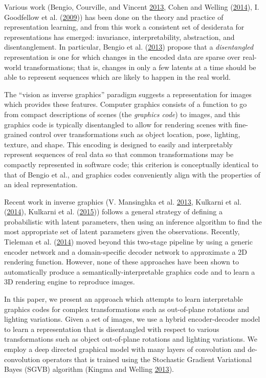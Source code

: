 \documentclass[12pt,twoside]{mitthesis}
\begin{document}
Various work (Bengio, Courville, and Vincent
\protect\hyperlink{ref-bengio2013representation}{2013}, Cohen and
Welling (\protect\hyperlink{ref-cohen2014learning}{2014}), I. Goodfellow
et al. (\protect\hyperlink{ref-goodfellow2009measuring}{2009})) has been
done on the theory and practice of representation learning, and from
this work a consistent set of desiderata for representations has
emerged: invariance, interpretability, abstraction, and disentanglement.
In particular, Bengio et al.
(\protect\hyperlink{ref-bengio2013representation}{2013}) propose that a
\emph{disentangled} representation is one for which changes in the
encoded data are sparse over real-world transformations; that is,
changes in only a few latents at a time should be able to represent
sequences which are likely to happen in the real world.

The ``vision as inverse graphics'' paradigm suggests a representation
for images which provides these features. Computer graphics consists of
a function to go from compact descriptions of scenes (the \emph{graphics
code}) to images, and this graphics code is typically disentangled to
allow for rendering scenes with fine-grained control over
transformations such as object location, pose, lighting, texture, and
shape. This encoding is designed to easily and interpretably represent
sequences of real data so that common transformations may be compactly
represented in software code; this criterion is conceptually identical
to that of Bengio et al., and graphics codes conveniently align with the
properties of an ideal representation.

Recent work in inverse graphics (V. Mansinghka et al.
\protect\hyperlink{ref-mansinghka2013approximate}{2013}, Kulkarni et al.
(\protect\hyperlink{ref-kulkarni2014inverse}{2014}), Kulkarni et al.
(\protect\hyperlink{ref-kulkarni2015picture}{2015})) follows a general
strategy of defining a probabilistic with latent parameters, then using
an inference algorithm to find the most appropriate set of latent
parameters given the observations. Recently, Tieleman et al.
(\protect\hyperlink{ref-tieleman2014optimizing}{2014}) moved beyond this
two-stage pipeline by using a generic encoder network and a
domain-specific decoder network to approximate a 2D rendering function.
However, none of these approaches have been shown to automatically
produce a semantically-interpretable graphics code and to learn a 3D
rendering engine to reproduce images.

In this paper, we present an approach which attempts to learn
interpretable graphics codes for complex transformations such as
out-of-plane rotations and lighting variations. Given a set of images,
we use a hybrid encoder-decoder model to learn a representation that is
disentangled with respect to various transformations such as object
out-of-plane rotations and lighting variations. We employ a deep
directed graphical model with many layers of convolution and
de-convolution operators that is trained using the Stochastic Gradient
Variational Bayes (SGVB) algorithm (Kingma and Welling
\protect\hyperlink{ref-kingma2013auto}{2013}).
\end{document}
